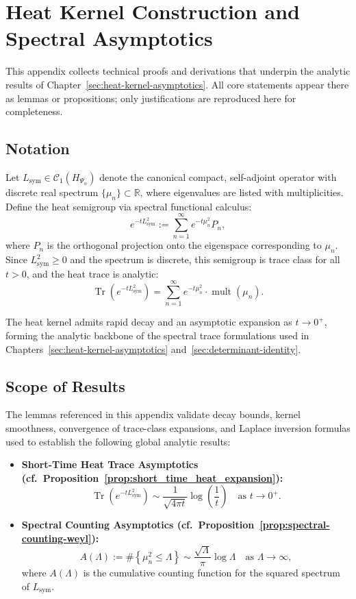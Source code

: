 \section{Heat Kernel Construction and Spectral Asymptotics}
\label{app:heat-kernel-construction}

This appendix collects technical proofs and derivations that underpin the analytic results of Chapter~\ref{sec:heat-kernel-asymptotics}. All core statements appear there as lemmas or propositions; only justifications are reproduced here for completeness.

\subsection*{Notation}

Let \( L_{\mathrm{sym}} \in \mathcal{C}_1(H_{\Psi_\alpha}) \) denote the canonical compact, self-adjoint operator with discrete real spectrum \( \{ \mu_n \} \subset \mathbb{R} \), where eigenvalues are listed with multiplicities. Define the heat semigroup via spectral functional calculus:
\[
e^{-t L_{\mathrm{sym}}^2} := \sum_{n=1}^\infty e^{-t \mu_n^2} P_n,
\]
where \( P_n \) is the orthogonal projection onto the eigenspace corresponding to \( \mu_n \). Since \( L_{\mathrm{sym}}^2 \ge 0 \) and the spectrum is discrete, this semigroup is trace class for all \( t > 0 \), and the heat trace is analytic:
\[
\operatorname{Tr}(e^{-t L_{\mathrm{sym}}^2}) = \sum_{n=1}^\infty e^{-t \mu_n^2} \cdot \operatorname{mult}(\mu_n).
\]

The heat kernel admits rapid decay and an asymptotic expansion as \( t \to 0^+ \), forming the analytic backbone of the spectral trace formulations used in Chapters~\ref{sec:heat-kernel-asymptotics} and~\ref{sec:determinant-identity}.

\subsection*{Scope of Results}

The lemmas referenced in this appendix validate decay bounds, kernel smoothness, convergence of trace-class expansions, and Laplace inversion formulas used to establish the following global analytic results:

\begin{itemize}
  \item \textbf{Short-Time Heat Trace Asymptotics (cf.~Proposition~\ref{prop:short_time_heat_expansion}):}
  \[
  \operatorname{Tr}(e^{-t L_{\mathrm{sym}}^2}) \sim \frac{1}{\sqrt{4\pi t}} \log\left( \frac{1}{t} \right)
  \quad \text{as } t \to 0^+.
  \]

  \item \textbf{Spectral Counting Asymptotics (cf.~Proposition~\ref{prop:spectral-counting-weyl}):}
  \[
  A(\Lambda) := \#\left\{ \mu_n^2 \le \Lambda \right\} \sim \frac{\sqrt{\Lambda}}{\pi} \log \Lambda
  \quad \text{as } \Lambda \to \infty,
  \]
  where \( A(\Lambda) \) is the cumulative counting function for the squared spectrum of \( L_{\mathrm{sym}} \).
\end{itemize}

